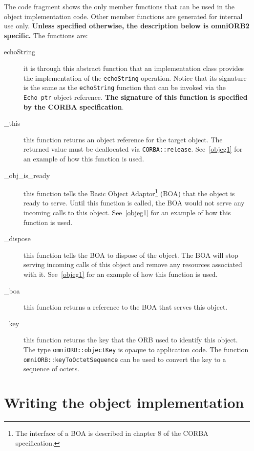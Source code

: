 \documentclass[11pt,twoside,onecolumn]{book}
\begin{document}
The code fragment shows the only member functions that can be used in the
object implementation code. Other member functions are generated for
internal use only. {\bf Unless specified otherwise, the description below
is omniORB2 specific.}  The functions are:

\begin{description}

\item[echoString] it is through this abstract function that an
implementation class provides the implementation of the {\tt echoString}
operation. Notice that its signature is the same as the {\tt echoString}
function that can be invoked via the {\tt Echo\_ptr} object reference.
{\bf The signature of this function is specified by the CORBA specification}.

\item[\_this] this function returns an object reference for the target
object. The returned value must be deallocated via {\tt CORBA::release}.
See~\ref{objeg1} for an example of how this function is used.

\item[\_obj\_is\_ready] this function tells the Basic Object
Adaptor\footnote{The interface of a BOA is described in chapter 8 of the
CORBA specification.} (BOA) that the object is ready to serve. Until this
function is called, the BOA would not serve any incoming calls to this
object. See~\ref{objeg1} for an example of how this function is used.

\item[\_dispose] this function tells the BOA to dispose of the object.
The BOA will stop serving incoming calls of this object and remove any
resources associated with it.
See~\ref{objeg1} for an example of how this function is used.

\item[\_boa] this function returns a reference to the BOA that serves this
object.

\item[\_key] this function returns the key that the ORB used to identify
this object. The type {\tt omniORB::objectKey} is opaque to application
code. The function {\tt omniORB::keyToOctetSequence} can be used to
convert the key to a sequence of octets.

\end{description}

\section{Writing the object implementation}
\label{objimpl}
\end{document}
